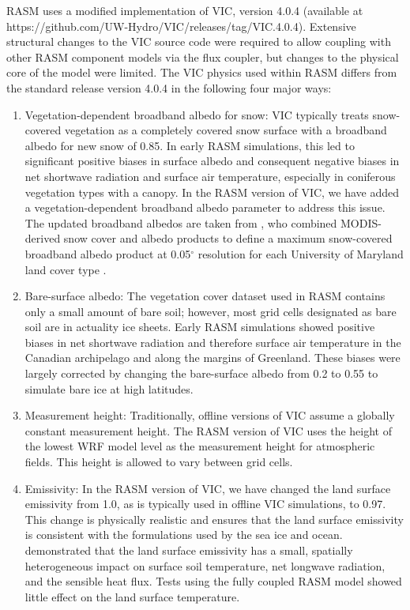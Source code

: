 RASM uses a modified implementation of VIC, version 4.0.4 (available at https://github.com/UW-Hydro/VIC/releases/tag/VIC.4.0.4).
Extensive structural changes to the VIC source code were required to allow coupling with other RASM component models via the flux coupler, but changes to the physical core of the model were limited.
The VIC physics used within RASM differs from the standard release version 4.0.4 in the following four major ways:

\begin{enumerate}
  \item Vegetation-dependent broadband albedo for snow: VIC typically treats snow-covered vegetation as a completely covered snow surface with a broadband albedo for new snow of 0.85. In early RASM simulations, this led to significant positive biases in surface albedo and consequent negative biases in net shortwave radiation and surface air temperature, especially in coniferous vegetation types with a canopy. In the RASM version of VIC, we have added a vegetation-dependent broadband albedo parameter to address this issue. The updated broadband albedos are taken from \citet{Barlage_2005}, who combined MODIS-derived snow cover and albedo products to define a maximum snow-covered broadband albedo product at 0.05$^{\circ}$ resolution for each University of Maryland land cover type \citep{Hansen_2000}.
  \item Bare-surface albedo: The vegetation cover dataset used in RASM contains only a small amount of bare soil; however, most grid cells designated as bare soil are in actuality ice sheets. Early RASM simulations showed positive biases in net shortwave radiation and therefore surface air temperature in the Canadian archipelago and along the margins of Greenland. These biases were largely corrected by changing the bare-surface albedo from 0.2 to 0.55 to simulate bare ice at high latitudes.
  \item Measurement height: Traditionally, offline versions of VIC assume a globally constant measurement height. The RASM version of VIC uses the height of the lowest WRF model level as the measurement height for atmospheric fields. This height is allowed to vary between grid cells.
  \item Emissivity: In the RASM version of VIC, we have changed the land surface emissivity from 1.0, as is typically used in offline VIC simulations, to 0.97. This change is physically realistic  and ensures that the land surface emissivity is \citep{Prabhakara_1976} consistent with the formulations used by the sea ice and ocean. \citet{Jin_2006} demonstrated that the land surface emissivity has a small, spatially heterogeneous impact on surface soil temperature, net longwave radiation, and the sensible heat flux. Tests using the fully coupled RASM model showed little effect on the land surface temperature.
\end{enumerate}

